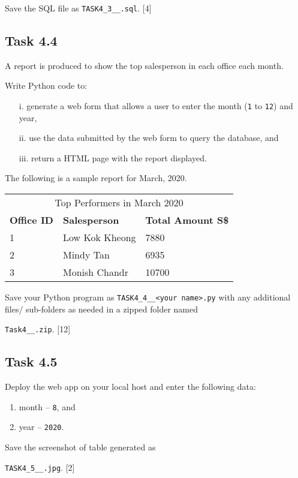 Save the SQL file as \texttt{TASK4\_3\_<your class>\_<your name>.sql}.
\hfill{} {[}4{]}

\subsection*{Task 4.4 }

A report is produced to show the top salesperson in each office each
month. 

Write Python code to: 
\begin{enumerate}
\item[i.]  generate a web form that allows a user to enter the month (\texttt{1}
to \texttt{12}) and year, 
\item[ii.]  use the data submitted by the web form to query the database, and 
\item[iii.]  return a HTML page with the report displayed. 
\end{enumerate}
The following is a sample report for March, 2020. 
\noindent \begin{center}
\begin{tabular}{|lll|}
\hline 
\multicolumn{3}{|c|}{Top Performers in March 2020}\tabularnewline
\textbf{Office ID} & \textbf{Salesperson} & \textbf{Total Amount S\$}\tabularnewline
1 & Low Kok Kheong & 7880\tabularnewline
2 & Mindy Tan & 6935\tabularnewline
3 & Monish Chandr & 10700\tabularnewline
\hline 
\end{tabular}
\par\end{center}

Save your Python program as \texttt{TASK4\_4\_<your class>\_<your
name>.py} with any additional files/ sub-folders as needed in a zipped
folder named 

\texttt{Task4\_<your class>\_<your name>.zip}.\hfill{} {[}12{]}

\subsection*{Task 4.5 }

Deploy the web app on your local host and enter the following data: 
\begin{enumerate}
\item month -- \texttt{8}, and 
\item year -- \texttt{2020}. 
\end{enumerate}
Save the screenshot of table generated as 

\texttt{TASK4\_5\_<your class>\_<your name>.jpg}. \hfill{} {[}2{]}